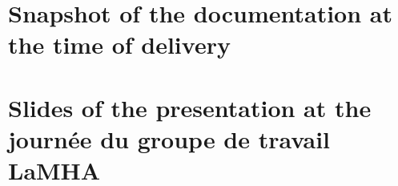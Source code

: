 \documentclass{deliverablereport}
\author{Florent Hivert}
\begin{document}
\maketitle
\githubissuedescription
\tableofcontents
\clearpage

\appendix
\section{Snapshot of the documentation at the time of delivery}

\section{Slides of the presentation at the journée du groupe de travail LaMHA}

\end{document}
